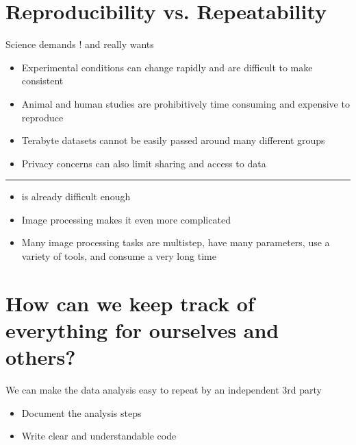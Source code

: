 \documentclass[letterpaper,10pt,english]{sphinxmanual}
\begin{document}
\section{Reproducibility vs. Repeatability}
\label{\detokenize{01-Introduction:id7}}
\sphinxAtStartPar
Science demands ! and really wants 
\begin{itemize}
\item {} 
\sphinxAtStartPar
Experimental conditions can change rapidly and are difficult to make consistent

\item {} 
\sphinxAtStartPar
Animal and human studies are prohibitively time consuming and expensive to reproduce

\item {} 
\sphinxAtStartPar
Terabyte datasets cannot be easily passed around many different groups

\item {} 
\sphinxAtStartPar
Privacy concerns can also limit sharing and access to data

\end{itemize}


\bigskip\hrule\bigskip

\begin{itemize}
\item {} 
\sphinxAtStartPar
{} is already difficult enough

\item {} 
\sphinxAtStartPar
Image processing makes it even more complicated

\item {} 
\sphinxAtStartPar
Many image processing tasks are multistep, have many parameters, use a variety of tools, and consume a very long time

\end{itemize}


\section{How can we keep track of everything for ourselves and others?}
\label{\detokenize{01-Introduction:how-can-we-keep-track-of-everything-for-ourselves-and-others}}
\sphinxAtStartPar
We can make the data analysis easy to repeat by an independent 3rd party
\begin{itemize}
\item {} 
\sphinxAtStartPar
Document the analysis steps

\item {} 
\sphinxAtStartPar
Write clear and understandable code

\end{itemize}
\end{document}
